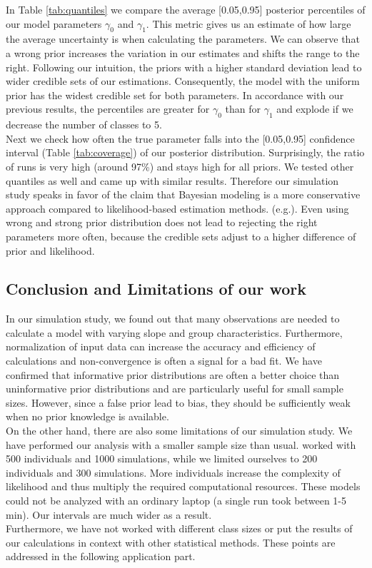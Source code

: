 In Table \ref{tab:quantiles} we compare the average [0.05,0.95] posterior percentiles of our model parameters $\gamma_0$ and $\gamma_1$. 
This metric gives us an estimate of how large the average uncertainty is when calculating the parameters. We can observe that a wrong prior increases the variation in our estimates and shifts the range to the right. 
Following our intuition, the priors with a higher standard deviation lead to wider credible sets of our estimations. Consequently, the model with the uniform prior has the widest credible set for both parameters. In accordance with our previous results, the percentiles are greater for $\gamma_0$ than for $\gamma_1$ and explode if we decrease the number of classes to 5.\\
Next we check how often the true parameter falls into the [0.05,0.95] confidence interval (Table \ref{tab:coverage}) of our posterior distribution. Surprisingly, the ratio of runs is very high (around 97\%) and stays high for all priors.
We tested other quantiles as well and came up with similar results. Therefore our simulation study speaks in favor of the claim that Bayesian modeling is a more conservative approach compared to likelihood-based estimation methods.  (e.g.\cite{stegmueller2013}). Even using wrong and strong prior distribution does not lead to rejecting the right parameters more often, because the credible sets adjust to a higher difference of prior and likelihood.

\subsection{Conclusion and Limitations of our work}

In our simulation study, we found out that many observations are needed to calculate a model with varying slope and group characteristics. Furthermore, normalization of input data can increase the accuracy and efficiency of calculations and non-convergence is often a signal for a bad fit. We have confirmed that informative prior distributions are often a better choice than uninformative prior distributions and are particularly useful for small sample sizes. However, since a false prior lead to bias, they should be sufficiently weak when no prior knowledge is available.\\
On the other hand, there are also some limitations of our simulation study. We have performed our analysis with a smaller sample size than usual. \cite{stegmueller2013} worked with 500 individuals and 1000 simulations, while we limited ourselves to 200 individuals and 300 simulations. More individuals increase the complexity of likelihood and thus multiply the required computational resources. These models could not be analyzed with an ordinary laptop (a single run took between 1-5 min). Our intervals are much wider as a result.\\
Furthermore, we have not worked with different class sizes or put the results of our calculations in context with other statistical methods. These points are addressed in the following application part.




